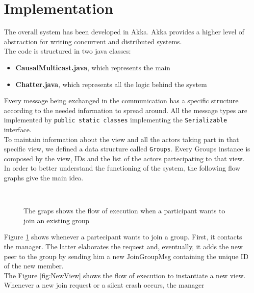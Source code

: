\documentclass[conference]{IEEEtran}
\begin{document}
\section{Implementation}
The overall system has been developed in Akka. Akka provides a higher
level of abstraction for writing concurrent and distributed systems. \\
The code is structured in two java classes:
\begin{itemize}
	\item \textbf{CausalMulticast.java}, which represents the main 
	\item \textbf{Chatter.java}, which represents all the logic behind
	the system
\end{itemize}
Every message being exchanged in the communication has a specific
structure according to the needed information to spread around. 
All the message types are implemented by \texttt{public static classes}
implementing the \texttt{Serializable} interface.\\
To maintain information about the view and all the actors taking part
in that specific view, we defined a data structure called \texttt{Groups}.
Every Groups instance is composed by the view, IDs and the list of the
actors partecipating to that view. \\
In order to better understand the functioning of the system, the 
following flow graphs give the main idea. \\
\begin{figure}[ht]%
	\centering
	\\%
	\caption{The graps shows the flow of execution when a participant
	wants to join an existing group}%
	\label{fig:join}%
\end{figure}
Figure \ref{fig:join} shows whenever a partecipant wants to join a 
group. First, it contacts the manager. The latter elaborates the
request and, eventually, it adds the new peer to the group by sending
him a new JoinGroupMsg containing the unique ID of the new member. \\
The Figure \ref{fig:NewView} shows the flow of execution to instantiate a new view.
Whenever a new join request or a silent crash occurs, the manager
\end{document}
